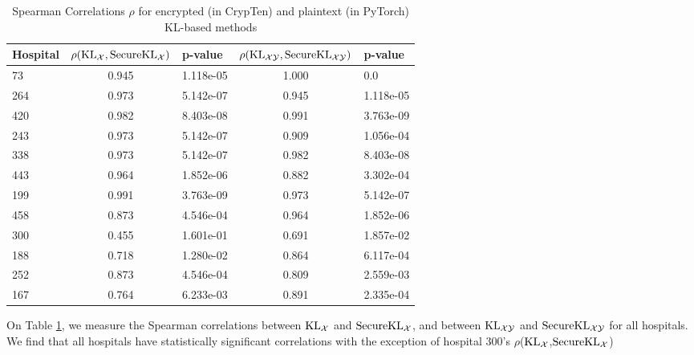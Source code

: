 \begin{table}[]
\begin{tabular}{lcl cl}
\toprule
Hospital & $\rho(\mathrm{KL}_\mathcal{X}, \mathrm{Secure}\mathrm{KL}_\mathcal{X})$ & p-value & $\rho(\mathrm{KL}_{\mathcal{X}\mathcal{Y}}, \mathrm{Secure}\mathrm{KL}_{\mathcal{X}\mathcal{Y}})$ &  p-value  \\ \midrule
73 &
0.945 & 1.118e-05 &
1.000 & 0.0\\
264 &
0.973 & 5.142e-07 &
0.945 & 1.118e-05 \\
420 &
0.982 & 8.403e-08 &
0.991 & 3.763e-09 \\
243 &
0.973 & 5.142e-07 &
0.909 & 1.056e-04 \\
338 &
0.973 & 5.142e-07 &
0.982 & 8.403e-08 \\
443 &
0.964 & 1.852e-06 &
0.882 & 3.302e-04 \\
199 &
0.991 & 3.763e-09 &
0.973 & 5.142e-07 \\
458 &
0.873 & 4.546e-04 &
0.964 & 1.852e-06 \\
300 &
0.455 & 1.601e-01 &
0.691 & 1.857e-02 \\
188 &
0.718 & 1.280e-02 &
0.864 & 6.117e-04 \\
252 &
0.873 & 4.546e-04 &
0.809 & 2.559e-03 \\
167 &
0.764 & 6.233e-03 &
0.891 & 2.335e-04 \\
\bottomrule
\end{tabular}
\caption{Spearman Correlations $\rho$ for encrypted (in CrypTen) and plaintext (in PyTorch) KL-based methods} 
\label{tab:encrypted_scores_corr_with_plaintext}
\end{table}
On Table \ref{tab:encrypted_scores_corr_with_plaintext}, we measure the Spearman correlations between $\mathrm{KL}_\mathcal{X}$ and $\mathrm{Secure}\mathrm{KL}_\mathcal{X}$, and between $\mathrm{KL}_{\mathcal{X}\mathcal{Y}}$ and $\mathrm{Secure}\mathrm{KL}_{\mathcal{X}\mathcal{Y}}$ for all hospitals. We find that all hospitals have statistically significant correlations with the exception of hospital 300's $\rho$($\mathrm{KL}_\mathcal{X}$,$\mathrm{Secure}\mathrm{KL}_\mathcal{X}$)
